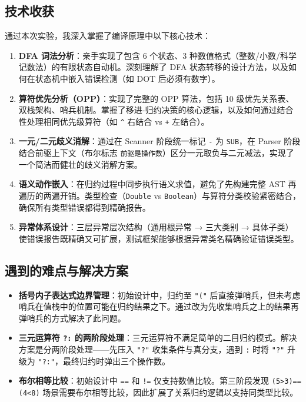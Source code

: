\documentclass[a4paper]{article}
\begin{document}
\subsection{技术收获}

通过本次实验，我深入掌握了编译原理中以下核心技术：

\begin{enumerate}
    \item \textbf{DFA 词法分析}：亲手实现了包含 6 个状态、3 种数值格式（整数/小数/科学记数法）的有限状态自动机。深刻理解了 DFA 状态转移的设计方法，以及如何在状态机中嵌入错误检测（如 DOT 后必须有数字）。
    
    \item \textbf{算符优先分析（OPP）}：实现了完整的 OPP 算法，包括 10 级优先关系表、双栈架构、哨兵机制。掌握了移进-归约决策的核心逻辑，以及如何通过结合性处理相同优先级算符（如 \texttt{\^} 右结合 vs \texttt{+} 左结合）。
    
    \item \textbf{一元/二元歧义消解}：通过在 Scanner 阶段统一标记 \texttt{-} 为 \texttt{SUB}，在 Parser 阶段结合前驱上下文（布尔标志 \texttt{前驱是操作数}）区分一元取负与二元减法，实现了一个简洁而健壮的歧义消解方案。
    
    \item \textbf{语义动作嵌入}：在归约过程中同步执行语义求值，避免了先构建完整 AST 再遍历的两遍开销。类型检查（\texttt{Double} vs \texttt{Boolean}）与算符分类校验紧密结合，确保所有类型错误都得到精确报告。
    
    \item \textbf{异常体系设计}：三层异常层次结构（通用根异常 → 三大类别 → 具体子类）使错误报告既精确又可扩展，测试框架能够根据异常类名精确验证错误类型。
\end{enumerate}

\subsection{遇到的难点与解决方案}

\begin{itemize}
    \item \textbf{括号内子表达式边界管理}：初始设计中，归约至 \texttt{"("} 后直接弹哨兵，但未考虑哨兵在值栈中的位置可能在归约结果之下。通过改为先收集哨兵之上的结果再弹哨兵的方式解决了此问题。
    
    \item \textbf{三元运算符 \texttt{?:} 的两阶段处理}：三元运算符不满足简单的二目归约模式。解决方案是分两阶段处理——先压入 \texttt{"?"} 收集条件与真分支，遇到 \texttt{:} 时将 \texttt{"?"} 升级为 \texttt{"?:"}，最终归约时弹出三个操作数。
    
    \item \textbf{布尔相等比较}：初始设计中 \texttt{==} 和 \texttt{!=} 仅支持数值比较。第三阶段发现 \texttt{(5>3)==(4<8)} 场景需要布尔相等比较，因此扩展了关系归约逻辑以支持同类型比较。
\end{itemize}
\end{document}

